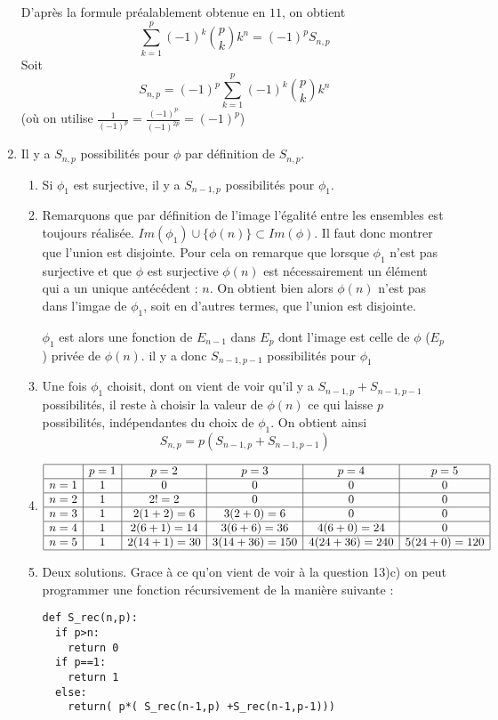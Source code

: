 \begin{correction}
\begin{enumerate}
D'après la formule préalablement obtenue en $11$, on obtient 
$$\sum_{k=1}^p (-1)^k \binom{p}{k } k^n = (-1)^p S_{n,p}$$
Soit 
$$S_{n,p}= (-1)^p \sum_{k=1}^p (-1)^k \binom{p}{k } k^n$$
(où on utilise $\frac{1}{(-1)^p} = \frac{(-1)^p}{(-1)^{2p}} = (-1)^p$)


\item Il y a $S_{n,p}$ possibilités pour $\phi$ par définition de $S_{n,p}$. 
\begin{enumerate}
\item Si $\phi_1$ est surjective, il  y a $S_{n-1,p}$ possibilités pour $\phi_1$.
\item Remarquons que par définition de l'image  l'égalité entre les ensembles est toujours réalisée.  $Im(\phi_1) \cup \{ \phi(n)\} \subset Im(\phi)$. Il faut donc montrer que l'union est disjointe. Pour cela on remarque que lorsque $\phi_1$ n'est pas surjective et que $\phi$ est surjective $\phi(n)$ est nécessairement un élément qui a un unique antécédent : $n$. On obtient bien alors $\phi(n)$ n'est pas dans l'imgae de $\phi_1$, soit en d'autres termes, que l'union est disjointe. 

$\phi_1$ est alors une fonction de $E_{n-1} $ dans $E_p$ dont l'image est celle de $\phi$ ($E_p$) privée de $\phi(n)$. il y a donc $S_{n-1,p-1}$ possibilités pour $\phi_1$ 
\item Une fois $\phi_1$ choisit, dont on vient de voir qu'il y a $S_{n-1,p}+S_{n-1,p-1}$ possibilités, il reste à choisir la valeur de $\phi(n)$ ce qui laisse $p$ possibilités, indépendantes du choix de $\phi_1$. On obtient ainsi 
$$S_{n,p} = p (S_{n-1,p}+S_{n-1,p-1})$$
\item 
$
\begin{array}{|c|c|c|c|c|c|}
\hline
& p=1& p=2 & p=3& p=4& p=5\\
\hline
n=1& 1 &0 & 0 &0 &0  \\
\hline
n=2& 1& 2!=2& 0 & 0& 0 \\
\hline
n=3& 1&2(1+2)=6 &3 (2+0)=6  &0 & 0 \\
\hline
n=4& 1&2(6+1)=14 & 3(6+6)=36 & 4(6+0)=24&0  \\
\hline
n=5& 1&2(14+1)=30 & 3(14+36)=150 &4(24+36)=240 & 5(24+0)=120 \\
\hline
\end{array}
$
\item 
Deux solutions.  Grace à ce qu'on vient de voir à la question 13)c) on peut programmer une fonction récursivement de la manière suivante : 
\begin{lstlisting}
def S_rec(n,p):
  if p>n:
    return 0
  if p==1:
    return 1
  else:
    return( p*( S_rec(n-1,p) +S_rec(n-1,p-1)))
 

\end{lstlisting}
\end{enumerate}
\end{enumerate}
\end{correction}
